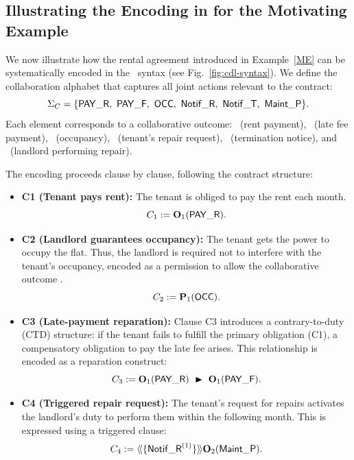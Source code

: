 \documentclass{article}
\begin{document}
  \subsection{Illustrating the Encoding in \cDL for the Motivating Example}
  \begin{example}
  \label{ex:contract-encoding}
  We now illustrate how the rental agreement introduced in Example~\ref{ME} 
  can be systematically encoded in the \cDL\ syntax (see Fig.~\ref{fig:cdl-syntax}).  
  We define the collaboration alphabet that captures all joint actions relevant to the contract:
  \[
  \Sigma_C = \{\PAY,\ \PAYF,\ \OCC,\ \notifrepair,\ \notifterm,\ \REPAIR\}.
  \]
  Each element corresponds to a collaborative outcome:
  \PAY\ (rent payment), \PAYF\ (late fee payment), \OCC\ (occupancy), 
  \notifrepair\ (tenant’s repair request), \notifterm\ (termination notice), 
  and \REPAIR\ (landlord performing repair).
  
  \medskip
  The encoding proceeds clause by clause, following the contract structure:
  
  \begin{itemize}
    \item \textbf{C1 (Tenant pays rent):}  
    The tenant is obliged to pay the rent each month.  
    \[
    C_1 := \obl[1]{\PAY}.
    \]
  
    \item \textbf{C2 (Landlord guarantees occupancy):}  
    The tenant gets the power to occupy the flat. 
    Thus, the landlord is required not to interfere with the tenant’s occupancy, 
    encoded as a permission to allow the collaborative outcome \OCC.  
    \[
    C_2 := \perm[1]{\OCC}.
    \]
  
    \item \textbf{C3 (Late-payment reparation):}  
    Clause C3 introduces a contrary-to-duty (CTD) structure: if the tenant fails to fulfill the primary obligation (C1), a compensatory obligation to pay the late fee arises.  
    This relationship is encoded as a reparation construct:
    \[
    C_3 := \obl[1]{\PAY}\ \repair\ \obl[1]{\PAYF}.
    \]
  
    \item \textbf{C4 (Triggered repair request):}  
    The tenant’s request for repairs activates the landlord’s duty to perform them within the following month.  
    This is expressed using a triggered clause:
    \[
    C_4 := 
    \trig[\{\notifrepair^{(1)}\}]{\obl[2]{\REPAIR}}.
    \]
  

\end{itemize}
\end{example}
\end{document}
